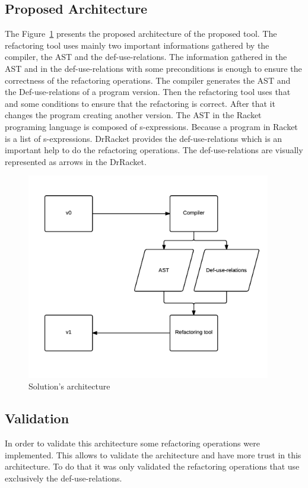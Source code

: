 \subsection{Proposed Architecture}

The Figure~\ref{fig:architecture} presents the proposed architecture of the proposed tool. 
The refactoring tool uses mainly two important informations gathered by the compiler, the AST and the def-use-relations.
The information gathered in the AST and in the def-use-relations with some preconditions is enough to ensure the correctness of the refactoring operations.
The compiler generates the AST and the Def-use-relations of a program version. Then the refactoring tool uses that and some conditions to ensure that the refactoring is correct. After that it changes the program creating another version.
The AST in the Racket programing language is composed of s-expressions. Because a program in Racket is a list of s-expressions.
DrRacket provides the def-use-relations which is an important help to do the refactoring operations. The def-use-relations are visually represented as arrows in the DrRacket.

\begin{figure}[htbp]
	\centering
	\includegraphics[width=0.95\textwidth]{img/arquitectura.png}
	\caption{Solution's architecture}
	\label{fig:architecture}
\end{figure}


\subsection{Validation}
In order to validate this architecture some refactoring operations were implemented. 
This allows to validate the architecture and have more trust in this architecture.
To do that it was only validated the refactoring operations that use exclusively the def-use-relations.

